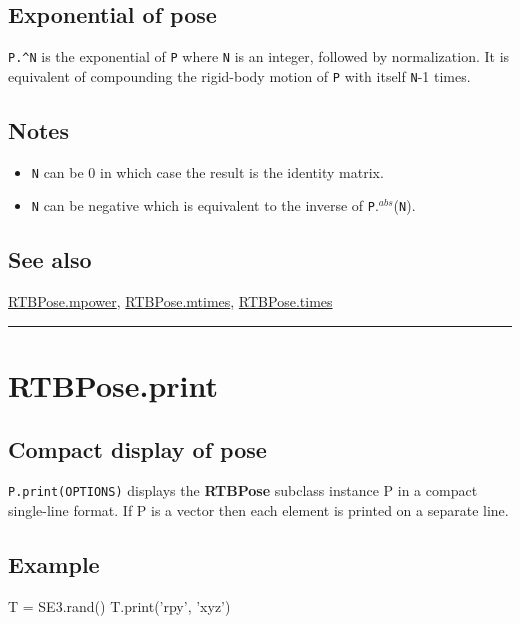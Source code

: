 \subsection*{Exponential of pose}


\texttt{P.\textasciicircum N} is the exponential of \texttt{P} where \texttt{N} is an integer, followed by normalization.  It is equivalent of compounding
the rigid-body motion of \texttt{P} with itself \texttt{N}-1 times.


\subsection*{Notes}
\begin{itemize}
  \item \texttt{N} can be 0 in which case the result is the identity matrix.
  \item \texttt{N} can be negative which is equivalent to the inverse of \texttt{P}.${}^{abs}$(\texttt{N}).
\end{itemize}

\subsection*{See also}


\hyperlink{RTBPose.mpower}{\color{blue} RTBPose.mpower}, \hyperlink{RTBPose.mtimes}{\color{blue} RTBPose.mtimes}, \hyperlink{RTBPose.times}{\color{blue} RTBPose.times}

\vspace{1.5ex}\hrule

\hypertarget{RTBPose.print}{\section*{RTBPose.print}}
\subsection*{Compact display of pose}


\texttt{P.print(OPTIONS)} displays the \textbf{\color{red} RTBPose} subclass instance P in a compact
single-line format.  If P is a vector then each element is printed on
a separate line.


\subsection*{Example}
\begin{Code}
    T = SE3.rand()
    T.print('rpy', 'xyz')  %

\end{Code}

